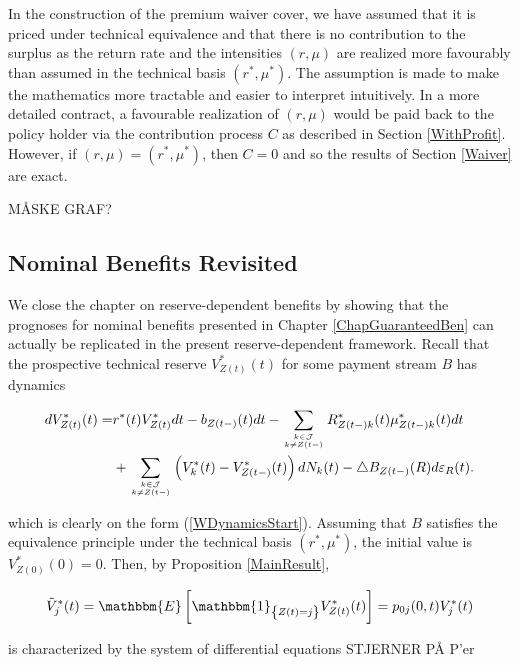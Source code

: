\documentclass{article}
\newcommand{\1}[1]{\mathbbm{1}_{\left\lbrace #1 \right\rbrace}}
\newcommand{\expec}[1][def]{\mathbbm{E} \left[ #1 \right]}
\theoremstyle{break}
\theoremstyle{remark}
\newenvironment{remark}
  {\pushQED{\qed}\renewcommand{\qedsymbol}{\scalebox{1.4}{$\circ$}}\remarkx}
  {\popQED\endremarkx}
\numberwithin{equation}{section}
\begin{document}
\begin{remark}
	In the construction of the premium waiver cover, we have assumed that it is priced under technical equivalence and that there is no contribution to the surplus as the return rate and the intensities $(r,\mu)$ are realized more favourably than assumed in the technical basis $(r^*,\mu^*)$. The assumption is made to make the mathematics more tractable and easier to interpret intuitively. In a more detailed contract, a favourable realization of $(r,\mu)$ would be paid back to the policy holder via the contribution process $C$ as described in Section \ref{WithProfit}. However, if $(r,\mu)=(r^*,\mu^*)$, then $C=0$ and so the results of Section \ref{Waiver} are exact.
\end{remark}

MÅSKE GRAF?

\subsection{Nominal Benefits Revisited}

We close the chapter on reserve-dependent benefits by showing that the prognoses for nominal benefits presented in Chapter \ref{ChapGuaranteedBen} can actually be replicated in the present reserve-dependent framework. Recall that the prospective technical reserve $V_{Z(t)}^*(t)$ for some payment stream $B$ has dynamics

\begin{align*}
	dV_{Z(t)}^*(t) =& r^*(t) V_{Z(t)}^* dt - b_{Z(t-)}(t) dt - \sum_{k \in \mathcal{J} \atop k \neq Z(t-)} R_{Z(t-)k}^*(t) \mu_{Z(t-)k}^*(t) dt \\
	&+ \sum_{k \in \mathcal{J} \atop k \neq Z(t-)} \left( V_k^*(t) - V_{Z(t-)}^*(t) \right) dN_k(t) - \triangle B_{Z(t-)}(R) d\varepsilon_{R}(t).
\end{align*}

which is clearly on the form (\ref{WDynamicsStart}). Assuming that $B$ satisfies the equivalence principle under the technical basis $(r^*,\mu^*)$, the initial value is $V_{Z(0)}^*(0)=0$. Then, by Proposition \ref{MainResult},

\begin{align*}
	\tilde{V}_j^*(t) = \expec[\1{Z(t)=j} V_{Z(t)}^*(t)] = p_{0j}(0,t) V_j^*(t)
\end{align*}

is characterized by the system of differential equations STJERNER PÅ P'er
\end{document}
